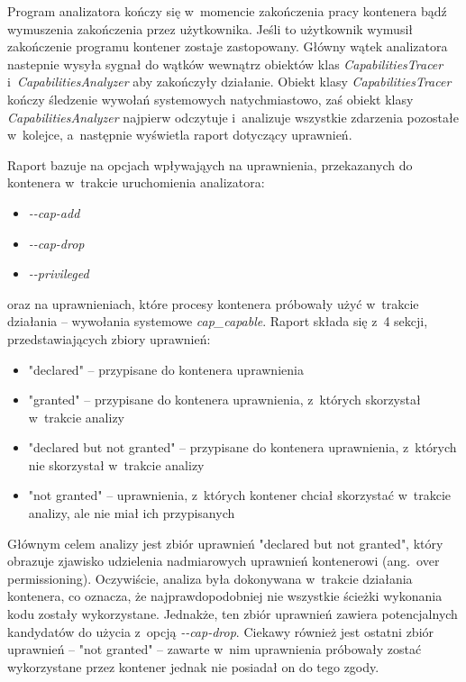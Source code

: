 Program analizatora kończy się w~momencie zakończenia pracy kontenera bądź wymuszenia zakończenia przez użytkownika. Jeśli to użytkownik wymusił zakończenie programu kontener zostaje zastopowany. Główny wątek analizatora nastepnie wysyła sygnał do wątków wewnątrz obiektów klas \textit{CapabilitiesTracer} i~\textit{CapabilitiesAnalyzer} aby zakończyły działanie. Obiekt klasy \textit{CapabilitiesTracer} kończy śledzenie wywołań systemowych natychmiastowo, zaś obiekt klasy \textit{CapabilitiesAnalyzer} najpierw odczytuje i~analizuje wszystkie zdarzenia pozostałe w~kolejce, a~następnie wyświetla raport dotyczący uprawnień.

Raport bazuje na opcjach wpływająych na uprawnienia, przekazanych do kontenera w~trakcie uruchomienia analizatora:
\begin{itemize}
    \item \textit{-{}-cap-add}
    \item \textit{-{}-cap-drop}
    \item \textit{-{}-privileged}
\end{itemize}
oraz na uprawnieniach, które procesy kontenera próbowały użyć w~trakcie działania -- wywołania systemowe \textit{cap_capable}. Raport składa się z~4 sekcji, przedstawiających zbiory uprawnień:
\begin{itemize}
    \item "declared" -- przypisane do kontenera uprawnienia
    \item "granted" -- przypisane do kontenera uprawnienia, z~których skorzystał w~trakcie analizy
    \item "declared but not granted" -- przypisane do kontenera uprawnienia, z~których nie skorzystał w~trakcie analizy
    \item "not granted" -- uprawnienia, z~których kontener chciał skorzystać w~trakcie analizy, ale nie miał ich przypisanych
\end{itemize}

Głównym celem analizy jest zbiór uprawnień "declared but not granted", który obrazuje zjawisko udzielenia nadmiarowych uprawnień kontenerowi (ang.~over permissioning). Oczywiście, analiza była dokonywana w~trakcie działania kontenera, co oznacza, że najprawdopodobniej nie wszystkie ścieżki wykonania kodu zostały wykorzystane. Jednakże, ten zbiór uprawnień zawiera potencjalnych kandydatów do użycia z~opcją \textit{-{}-cap-drop}. Ciekawy również jest ostatni zbiór uprawnień -- "not granted" -- zawarte w~nim uprawnienia próbowały zostać wykorzystane przez kontener jednak nie posiadał on do tego zgody.

